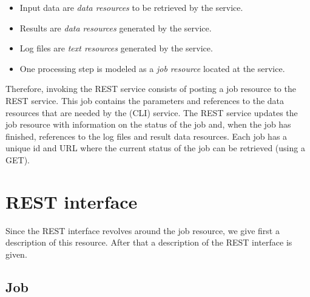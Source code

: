 \documentclass[a4paper]{article}
\begin{document}
\begin{itemize}
  \item Input data are \emph{data resources} to be retrieved by the service.
  \item Results are \emph{data resources} generated by the service.
  \item Log files are \emph{text resources} generated by the service.
  \item One processing step is modeled as a \emph{job resource} located at the
  service.
\end{itemize}

Therefore, invoking the REST service consists of posting a job resource to the
REST service. This job contains the parameters and references to the data
resources that are needed by the (CLI) service.  The REST service updates the
job resource with information on the status of the job and, when the job has
finished, references to the log files and result data resources. Each job has a
unique id and URL where the current status of the job can be retrieved (using a
GET). 

\section{REST interface}
Since the REST interface revolves around the job resource, we give first a
description of this resource. After that a description of the REST interface is
given. 

\subsection{Job}
\end{document}

